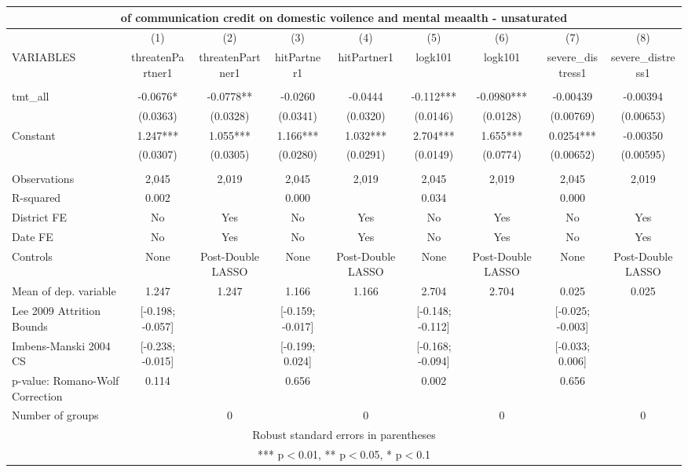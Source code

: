 \documentclass[]{article}
\begin{document}
\begin{tabular}{lcccccccc}
\multicolumn{9}{c}{of communication credit on domestic voilence and mental meaalth - unsaturated} \\ \hline
 & (1) & (2) & (3) & (4) & (5) & (6) & (7) & (8) \\
VARIABLES & threatenPartner1 & threatenPartner1 & hitPartner1 & hitPartner1 & logk101 & logk101 & severe\_distress1 & severe\_distress1 \\ \hline
 &  &  &  &  &  &  &  &  \\
tmt\_all & -0.0676* & -0.0778** & -0.0260 & -0.0444 & -0.112*** & -0.0980*** & -0.00439 & -0.00394 \\
 & (0.0363) & (0.0328) & (0.0341) & (0.0320) & (0.0146) & (0.0128) & (0.00769) & (0.00653) \\
Constant & 1.247*** & 1.055*** & 1.166*** & 1.032*** & 2.704*** & 1.655*** & 0.0254*** & -0.00350 \\
 & (0.0307) & (0.0305) & (0.0280) & (0.0291) & (0.0149) & (0.0774) & (0.00652) & (0.00595) \\
 &  &  &  &  &  &  &  &  \\
Observations & 2,045 & 2,019 & 2,045 & 2,019 & 2,045 & 2,019 & 2,045 & 2,019 \\
R-squared & 0.002 &  & 0.000 &  & 0.034 &  & 0.000 &  \\
District FE & No & Yes & No & Yes & No & Yes & No & Yes \\
Date FE & No & Yes & No & Yes & No & Yes & No & Yes \\
Controls & None & Post-Double LASSO & None & Post-Double LASSO & None & Post-Double LASSO & None & Post-Double LASSO \\
Mean of dep. variable & 1.247 & 1.247 & 1.166 & 1.166 & 2.704 & 2.704 & 0.025 & 0.025 \\
Lee 2009 Attrition Bounds & [-0.198; -0.057] &  & [-0.159; -0.017] &  & [-0.148; -0.112] &  & [-0.025; -0.003] &  \\
Imbens-Manski 2004 CS & [-0.238; -0.015] &  & [-0.199; 0.024] &  & [-0.168; -0.094] &  & [-0.033; 0.006] &  \\
p-value: Romano-Wolf Correction & 0.114 &  & 0.656 &  & 0.002 &  & 0.656 &  \\
 Number of groups &  & 0 &  & 0 &  & 0 &  & 0 \\ \hline
\multicolumn{9}{c}{ Robust standard errors in parentheses} \\
\multicolumn{9}{c}{ *** p$<$0.01, ** p$<$0.05, * p$<$0.1} \\
\end{tabular}
\end{document}
